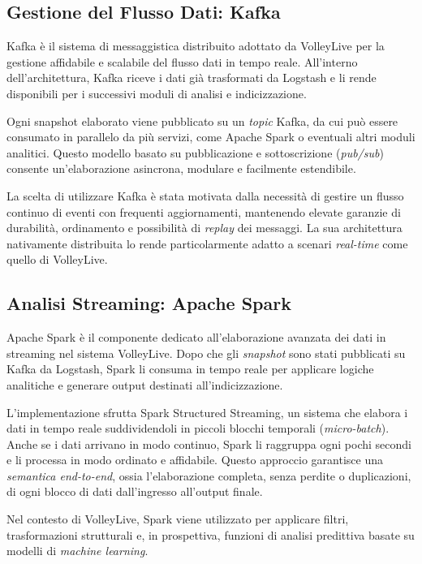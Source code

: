 \documentclass[a4paper,12pt]{report}
\begin{document}
\subsection{Gestione del Flusso Dati: Kafka}

Kafka è il sistema di messaggistica distribuito adottato da VolleyLive per la gestione affidabile e scalabile del flusso dati in tempo reale. All’interno dell’architettura, Kafka riceve i dati già trasformati da Logstash e li rende disponibili per i successivi moduli di analisi e indicizzazione.

Ogni snapshot elaborato viene pubblicato su un \textit{topic} Kafka, da cui può essere consumato in parallelo da più servizi, come Apache Spark o eventuali altri moduli analitici. Questo modello basato su pubblicazione e sottoscrizione (\textit{pub/sub}) consente un’elaborazione asincrona, modulare e facilmente estendibile.

La scelta di utilizzare Kafka è stata motivata dalla necessità di gestire un flusso continuo di eventi con frequenti aggiornamenti, mantenendo elevate garanzie di durabilità, ordinamento e possibilità di \textit{replay} dei messaggi. La sua architettura nativamente distribuita lo rende particolarmente adatto a scenari \textit{real-time} come quello di VolleyLive.


\subsection{Analisi Streaming: Apache Spark}

Apache Spark è il componente dedicato all’elaborazione avanzata dei dati in streaming nel sistema VolleyLive. Dopo che gli \textit{snapshot} sono stati pubblicati su Kafka da Logstash, Spark li consuma in tempo reale per applicare logiche analitiche e generare output destinati all’indicizzazione.

L’implementazione sfrutta Spark Structured Streaming, un sistema che elabora i dati in tempo reale suddividendoli in piccoli blocchi temporali (\textit{micro-batch}). Anche se i dati arrivano in modo continuo, Spark li raggruppa ogni pochi secondi e li processa in modo ordinato e affidabile. Questo approccio garantisce una \textit{semantica end-to-end}, ossia l’elaborazione completa, senza perdite o duplicazioni, di ogni blocco di dati dall’ingresso all’output finale.

Nel contesto di VolleyLive, Spark viene utilizzato per applicare filtri, trasformazioni strutturali e, in prospettiva, funzioni di analisi predittiva basate su modelli di \textit{machine learning}.
\end{document}
